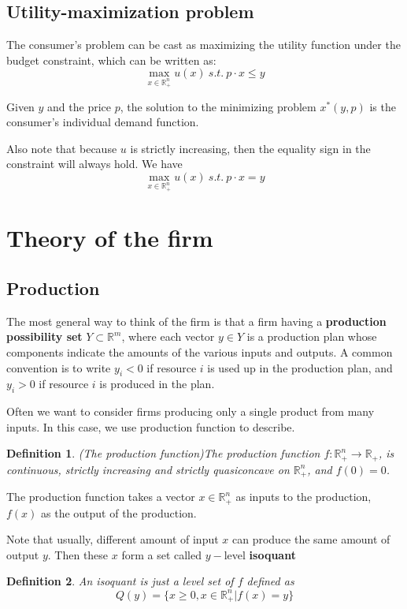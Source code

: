 \documentclass[a4paper,13pt]{report}
\newcommand{\R}{\mathbb{R}}
\newtheorem*{definition}{Definition}
\begin{document}
\subsection{Utility-maximization problem}
The consumer's problem can be cast as maximizing the utility  function under the budget constraint, which can be written as:\cite{jehle2001advanced}
$$\max_{x\in \R^n_+} u(x) ~ s.t. ~ p\cdot x \leq y$$

Given $y$ and the price $p$, the solution to the minimizing problem $x^*(y,p)$ is the consumer's individual demand function.

Also note that because $u$ is strictly increasing, then the equality sign in the constraint will always hold. We have  
$$\max_{x\in \R^n_+} u(x) ~ s.t. ~ p\cdot x = y$$
\section{Theory of the firm}
\subsection{Production}
The most general way to think of the firm is that a firm having a \textbf{production possibility set} $Y\subset \R^m$, where each vector $y\in Y$ is a production plan whose components indicate the amounts of the various inputs and outputs. A common convention is to write $y_i < 0$ if resource $i$ is used up in the production plan, and $y_i >0$ if resource $i$ is produced in the plan.

Often we want to consider firms producing only a single product from many inputs. In this case, we use production function to describe.
\begin{definition}
(The production function)The production function $f:\R^n_+ \rightarrow \R_+$, is continuous, strictly increasing and strictly quasiconcave on $\R^n_+$, and $f(0)=0$.\cite{jehle2001advanced}
\end{definition}
The production function takes a vector $x\in \R^n_+$ as inputs to the production, $f(x)$ as the output of the production.

Note that usually, different amount of input $x$ can produce the same amount of output $y$. Then these $x$ form a set called $y-$level \textbf{isoquant}
\begin{definition}
An isoquant is just a level set of $f$ defined as \cite{jehle2001advanced}
$$Q(y)=\{x\geq 0,x\in \R^n_+ | f(x) = y\}$$
\end{definition}
\end{document}
